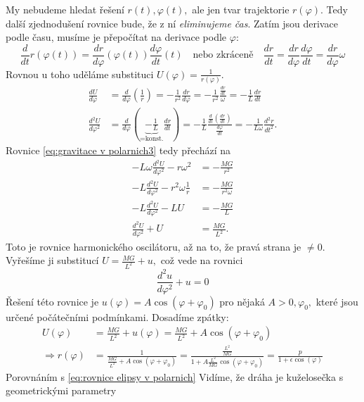 My nebudeme hledat řešení $r(t), \varphi(t),$ ale jen tvar trajektorie $r(\varphi).$ Tedy další zjednodušení rovnice bude, že z ní \emph{eliminujeme čas}. Zatím jsou derivace podle času, musíme je přepočítat na derivace podle $\varphi$:
\begin{equation*}
	\frac{d}{dt}r(\varphi(t))=\frac{dr}{d\varphi}(\varphi(t))\frac{d\varphi}{dt}(t) \quad \text{nebo zkráceně}\quad \frac{dr}{dt}=\frac{dr}{d\varphi}\frac{d\varphi}{dt}=\frac{dr}{d\varphi}\omega
\end{equation*}
Rovnou u toho uděláme substituci $U(\varphi)=\frac{1}{r(\varphi)}.$
\begin{align*}
	\frac{dU}{d\varphi} &= \frac{d}{d\varphi}\left(\frac{1}{r}\right)=-\frac{1}{r^{2}}\frac{dr}{d\varphi}=-\frac{1}{r^{2}}\frac{\frac{dr}{dt}}{\omega}=-\frac{1}{L}\frac{dr}{dt} \\
	\frac{d^{2}U}{d\varphi^{2}} &= \frac{d}{d\varphi}\left(\underbrace{-\frac{1}{L}}_{=\text{konst.}}\frac{dr}{dt}\right)= -\frac{1}{L}\frac{\frac{d}{dt}\left(\frac{dr}{dt}\right)}{\frac{d\varphi}{dt}} = -\frac{1}{L\omega} \frac{d^{2}r}{dt^{2}}.
\end{align*}
Rovnice \ref{eq:gravitace v polarnich3} tedy přechází na
\begin{align*}
	-L\omega \frac{d^{2}U}{d\varphi^{2}}-r\omega^{2}&=-\frac{MG}{r^{2}} \\
	-L\frac{d^{2}U}{d\varphi^{2}}-r^{2}\omega \frac{1}{r}&=-\frac{MG}{r^{2}\omega} \\
	-L \frac{d^{2}U}{d\varphi^{2}}-LU &= -\frac{MG}{L} \\
	\frac{d^{2}U}{d\varphi^{2}}+U &= \frac{MG}{L^{2}}.
\end{align*}
Toto je rovnice harmonického oscilátoru, až na to, že pravá strana je $\neq 0$. Vyřešíme ji substitucí $U=\frac{MG}{L^{2}}+u,$ což vede na rovnici
\begin{equation*}
  \frac{d^{2}u}{d\varphi^{2}}+u=0
\end{equation*}
Řešení této rovnice je $u(\varphi)=A\cos(\varphi+\varphi_0)$ pro nějaká $A>0, \varphi_0,$ které jsou určené počátečními podmínkami. Dosadíme zpátky:
\begin{align*}
	U(\varphi)&=\frac{MG}{L^{2}}+u(\varphi)=\frac{MG}{L^{2}}+A\cos(\varphi+\varphi_0)\\
	\Rightarrow r(\varphi)&=\frac{1}{\frac{MG}{L^{2}}+A\cos(\varphi+\varphi_0)}=\frac{\frac{L^{2}}{MG}}{1+A\frac{L^{2}}{MG}\cos(\varphi+\varphi_0)} = \frac{p}{1+\epsilon\cos(\varphi)}
\end{align*}
Porovnáním s \ref{eq:rovnice elipsy v polarnich} Vidíme, že dráha je kuželosečka s geometrickými parametry

